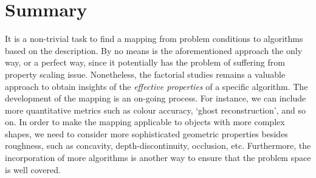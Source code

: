 \section{Summary}
It is a non-trivial task to find a mapping from problem conditions to algorithms based on the description. By no means is the aforementioned approach the only way, or a perfect way, since it potentially has the problem of suffering from property scaling issue. Nonetheless, the factorial studies remains a valuable approach to obtain insights of the \textit{effective properties} of a specific algorithm. The development of the mapping is an on-going process. For instance, we can include more quantitative metrics such as colour accuracy, `ghost reconstruction', and so on. In order to make the mapping applicable to objects with more complex shapes, we need to consider more sophisticated geometric properties besides roughness, such as concavity, depth-discontinuity, occlusion, etc. Furthermore, the incorporation of more algorithms is another way to ensure that the problem space is well covered.